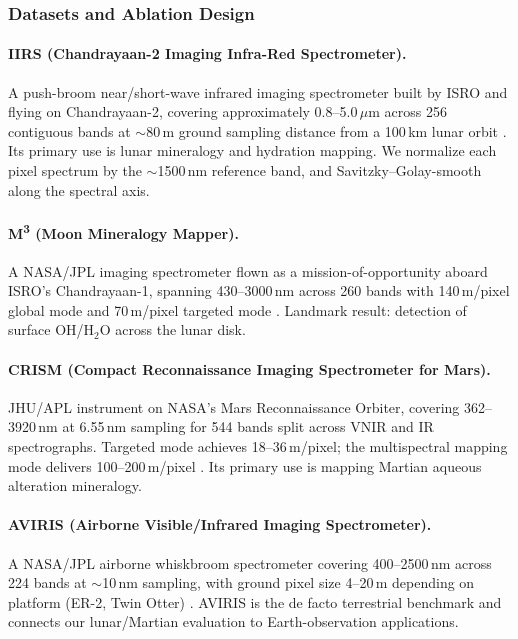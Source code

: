 \documentclass{article} %
\begin{document}
\subsubsection{Datasets and Ablation Design}
\label{sec:datasets}

\paragraph{IIRS (Chandrayaan-2 Imaging Infra-Red Spectrometer).} A push-broom near/short-wave infrared imaging spectrometer built by ISRO and flying on Chandrayaan-2, covering approximately 0.8--5.0\,$\mu$m across 256 contiguous bands at $\sim$80\,m ground sampling distance from a 100\,km lunar orbit \citep{chowdhury2020iirs}. Its primary use is lunar mineralogy and hydration mapping. We normalize each pixel spectrum by the $\sim$1500\,nm reference band, and Savitzky--Golay-smooth along the spectral axis.

\paragraph{M\textsuperscript{3} (Moon Mineralogy Mapper).} A NASA/JPL imaging spectrometer flown as a mission-of-opportunity aboard ISRO's Chandrayaan-1, spanning 430--3000\,nm across 260 bands with 140\,m/pixel global mode and 70\,m/pixel targeted mode \citep{pieters2009m3}. Landmark result: detection of surface OH/H$_2$O across the lunar disk.

\paragraph{CRISM (Compact Reconnaissance Imaging Spectrometer for Mars).} JHU/APL instrument on NASA's Mars Reconnaissance Orbiter, covering 362--3920\,nm at 6.55\,nm sampling for 544 bands split across VNIR and IR spectrographs. Targeted mode achieves 18--36\,m/pixel; the multispectral mapping mode delivers 100--200\,m/pixel \citep{murchie2007crism}. Its primary use is mapping Martian aqueous alteration mineralogy.

\paragraph{AVIRIS (Airborne Visible/Infrared Imaging Spectrometer).} A NASA/JPL airborne whiskbroom spectrometer covering 400--2500\,nm across 224 bands at $\sim$10\,nm sampling, with ground pixel size 4--20\,m depending on platform (ER-2, Twin Otter) \citep{green1998aviris}. AVIRIS is the de facto terrestrial benchmark and connects our lunar/Martian evaluation to Earth-observation applications.
\end{document}

